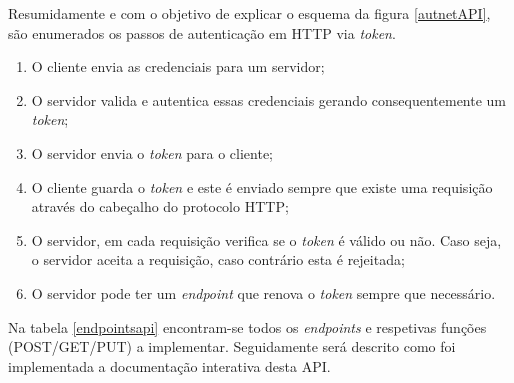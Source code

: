 Resumidamente e com o objetivo de explicar o esquema da figura \ref{autnetAPI}, são enumerados os passos de autenticação em \ac{HTTP} via \textit{token}. 

\begin{enumerate}
	\item O cliente envia as credenciais para um servidor;
	\item O servidor valida e autentica essas credenciais gerando consequentemente um \textit{token};
	\item O servidor envia o \textit{token} para o cliente;
	\item O cliente guarda o \textit{token} e este é enviado sempre que existe uma requisição através do cabeçalho do protocolo HTTP; 
	\item O servidor, em cada requisição verifica se o \textit{token} é válido ou não. Caso seja, o servidor aceita a requisição, caso contrário esta é rejeitada;
	\item O servidor pode ter um \textit{endpoint} que renova o \textit{token} sempre que necessário. 
\end{enumerate}




Na tabela \ref{endpointsapi} encontram-se todos os \textit{endpoints} e respetivas funções (POST/GET/PUT) a implementar. Seguidamente será descrito como foi implementada a documentação interativa desta \ac{API}.  




